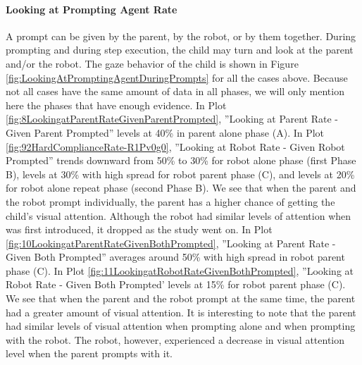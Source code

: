\paragraph{Looking at Prompting Agent Rate}
A prompt can be given by the parent, by the robot, or by them together.  During prompting and during step execution, the child may turn and look at the parent and/or the robot.  The gaze behavior of the child is shown in Figure \ref{fig:LookingAtPromptingAgentDuringPrompts} for all the cases above.  Because not all cases have the same amount of data in all phases, we will only mention here the phases that have enough evidence.  In Plot \ref{fig:8LookingatParentRateGivenParentPrompted}, ''Looking at Parent Rate - Given Parent Prompted'' levels at 40\% in parent alone phase (A).  In Plot \ref{fig:92HardComplianceRate-R1Pv0g0}, ''Looking at Robot Rate - Given Robot Prompted'' trends downward from 50\% to 30\% for robot alone phase (first Phase B), levels at 30\% with high spread for robot parent phase (C), and levels at 20\% for robot alone repeat phase (second Phase B).  We see that when the parent and the robot prompt individually, the parent has a higher chance of getting the child's visual attention.  Although the robot had similar levels of attention when was first introduced, it dropped as the study went on.  In Plot \ref{fig:10LookingatParentRateGivenBothPrompted}, ''Looking at Parent Rate - Given Both Prompted'' averages around 50\% with high spread in robot parent phase (C).  In Plot \ref{fig:11LookingatRobotRateGivenBothPrompted}, ''Looking at Robot Rate - Given Both Prompted' levels at 15\% for robot parent phase (C).  We see that when the parent and the robot prompt at the same time, the parent had a greater amount of visual attention.  It is interesting to note that the parent had similar levels of visual attention when prompting alone and when prompting with the robot.  The robot, however, experienced a decrease in visual attention level when the parent prompts with it.
